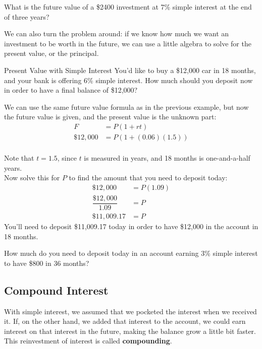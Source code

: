 \begin{try}
What is the future value of a \$2400 investment at 7\% simple interest at the end of three years?
\end{try}
\vfill

We can also turn the problem around: if we know how much we want an investment to be worth in the future, we can use a little algebra to solve for the present value, or the principal.
\vfill

\begin{example}[https://www.youtube.com/watch?v=0GFzH0JPYeY&list=PLfmpjsIzhztsZtnb7HnXrQ8SLoiOCIcAM&index=15]{Present Value with Simple Interest}
You'd like to buy a \$12,000 car in 18 months, and your bank is offering 6\% simple interest.  How much should you deposit now in order to have a final balance of \$12,000?

\solline
{}
We can use the same future value formula as in the previous example, but now the future value is given, and the present value is the unknown part:
\begin{align*}
F &= P(1+rt)\\
\$12,000 &= P(1+(0.06)(1.5))\\
\end{align*}

Note that $t=1.5$, since $t$ is measured in years, and 18 months is one-and-a-half years.\\

Now solve this for $P$ to find the amount that you need to deposit today:
\begin{align*}
\$12,000 &= P(1.09)\\
\dfrac{\$12,000}{1.09} &= P\\
\boxed{\$11,009.17} &= P
\end{align*}
You'll need to deposit \$11,009.17 today in order to have \$12,000 in the account in 18 months.
\end{example}
\vfill

\begin{try}
How much do you need to deposit today in an account earning 3\% simple interest to have \$800 in 36 months?
\end{try}
\vfill
\pagebreak

\subsection{Compound Interest}
With simple interest, we assumed that we pocketed the interest when we received it.  If, on the other hand, we added that interest to the account, we could earn interest on that interest in the future, making the balance grow a little bit faster.  This reinvestment of interest is called \textbf{compounding}.\\

